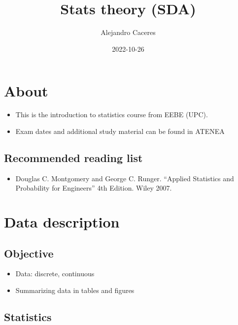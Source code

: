 \documentclass[
]{book}
\title{Stats theory (SDA)}
\author{Alejandro Caceres}
\date{2022-10-26}
\providecommand{\tightlist}{%
  \setlength{\itemsep}{0pt}\setlength{\parskip}{0pt}}
\begin{document}
\maketitle

{
\setcounter{tocdepth}{1}
\tableofcontents
}
\hypertarget{about}{%
\chapter{About}\label{about}}

\begin{itemize}
\item
  This is the introduction to statistics course from EEBE (UPC).
\item
  Exam dates and additional study material can be found in ATENEA
\end{itemize}

\hypertarget{recommended-reading-list}{%
\section{Recommended reading list}\label{recommended-reading-list}}

\begin{itemize}
\tightlist
\item
  Douglas C. Montgomery and George C. Runger. ``Applied Statistics and Probability for Engineers'' 4th Edition. Wiley 2007.
\end{itemize}

\hypertarget{data-description}{%
\chapter{Data description}\label{data-description}}

\hypertarget{objective}{%
\section{Objective}\label{objective}}

\begin{itemize}
\tightlist
\item
  Data: discrete, continuous
\item
  Summarizing data in tables and figures
\end{itemize}

\hypertarget{statistics}{%
\section{Statistics}\label{statistics}}
\end{document}
